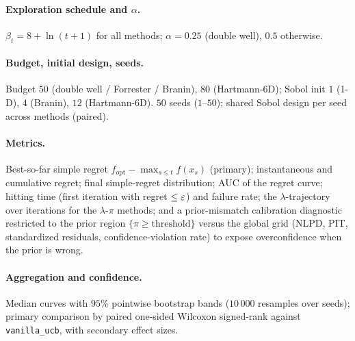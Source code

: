 \paragraph{Exploration schedule and $\alpha$.}
$\beta_t=8+\ln(t+1)$ for all methods; $\alpha=0.25$ (double well), $0.5$
otherwise.

\paragraph{Budget, initial design, seeds.}
Budget $50$ (double well / Forrester / Branin), $80$ (Hartmann-6D); Sobol init
$1$ (1-D), $4$ (Branin), $12$ (Hartmann-6D). $50$ seeds ($1$--$50$); shared Sobol
design per seed across methods (paired).

\paragraph{Metrics.}
Best-so-far simple regret $f_{\mathrm{opt}}-\max_{s\le t}f(x_s)$ (primary);
instantaneous and cumulative regret; final simple-regret distribution; AUC of the
regret curve; hitting time (first iteration with regret $\le\varepsilon$) and failure
rate; the $\lambda$-trajectory over iterations for the $\lambda$-$\pi$ methods;
and a prior-mismatch calibration diagnostic restricted to the prior region
$\{\pi\ge\text{threshold}\}$ versus the global grid (NLPD, PIT, standardized
residuals, confidence-violation rate) to expose overconfidence when the prior is
wrong.

\paragraph{Aggregation and confidence.}
Median curves with $95\%$ pointwise bootstrap bands ($10\,000$ resamples over
seeds); primary comparison by paired one-sided Wilcoxon signed-rank against
\texttt{vanilla\_ucb}, with secondary effect sizes.

